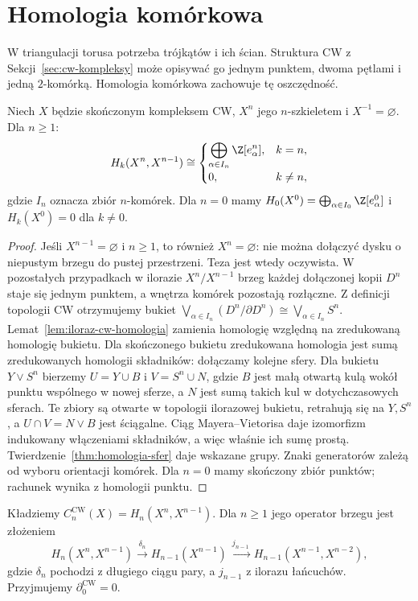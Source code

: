 \section{Homologia komórkowa}
\label{sec:homologia-komorkowa}

W triangulacji torusa potrzeba
trójkątów i ich ścian. Struktura
CW z Sekcji~\ref{sec:cw-kompleksy}
może opisywać go jednym punktem,
dwoma pętlami i jedną
$2$-komórką. Homologia komórkowa
zachowuje tę oszczędność.

\begin{twierdzenie}
\label{thm:warstwa-komorek}
Niech $X$ będzie skończonym
kompleksem CW, $X^n$ jego
$n$-szkieletem i $X^{-1}=\varnothing$.
Dla $n\geq1$:
\[
 H_k(X^n,X^{n-1})
 \cong
 \begin{cases}
 \displaystyle\bigoplus_{\alpha\in I_n}\Z[e_\alpha^n],
 &k=n,\\[3pt]0,&k\ne n,
 \end{cases}
\]
gdzie $I_n$ oznacza zbiór $n$-komórek.
Dla $n=0$ mamy
$H_0(X^0)=\bigoplus_{\alpha\in I_0}\Z[e_\alpha^0]$
i $H_k(X^0)=0$ dla $k\ne0$.
\end{twierdzenie}
\begin{proof}
Jeśli $X^{n-1}=\varnothing$ i $n\geq1$, to również $X^n=\varnothing$:
nie można dołączyć dysku o niepustym brzegu do pustej przestrzeni.
Teza jest wtedy oczywista. W pozostałych przypadkach
w ilorazie $X^n/X^{n-1}$
brzeg każdej dołączonej kopii
$D^n$ staje się jednym punktem,
a wnętrza komórek pozostają
rozłączne. Z definicji topologii
CW otrzymujemy bukiet
$\bigvee_{\alpha\in I_n}
(D^n/\partial D^n)\cong
\bigvee_{\alpha\in I_n}S^n$.
Lemat~\ref{lem:iloraz-cw-homologia}
zamienia homologię względną
na zredukowaną homologię bukietu.
Dla skończonego bukietu
zredukowana homologia jest sumą
zredukowanych homologii składników:
dołączamy kolejne sfery. Dla bukietu $Y\vee S^n$
bierzemy $U=Y\cup B$ i $V=S^n\cup N$, gdzie $B$ jest małą
otwartą kulą wokół punktu wspólnego w nowej sferze, a $N$
jest sumą takich kul w dotychczasowych sferach.
Te zbiory są otwarte w topologii ilorazowej bukietu,
retrahują się na $Y,S^n$, a $U\cap V=N\vee B$ jest ściągalne.
Ciąg Mayera--Vietorisa daje izomorfizm indukowany włączeniami
składników, a więc właśnie ich sumę prostą.
Twierdzenie~\ref{thm:homologia-sfer}
daje wskazane grupy.
Znaki generatorów zależą
od wyboru orientacji komórek.
Dla $n=0$ mamy skończony
zbiór punktów; rachunek wynika
z homologii punktu.
\end{proof}

\begin{definicja}
\label{def:kompleks-komorkowy}
Kładziemy
$C_n^{\mathrm{CW}}(X)=H_n(X^n,X^{n-1})$.
Dla $n\geq1$ jego operator brzegu
jest złożeniem
\begin{equation}\label{eq:cellular-boundary}
 H_n(X^n,X^{n-1})
 \xrightarrow{\ \delta_n\ }
 H_{n-1}(X^{n-1})
 \xrightarrow{\ j_{n-1}\ }
 H_{n-1}(X^{n-1},X^{n-2}),
\end{equation}
gdzie $\delta_n$ pochodzi z
długiego ciągu pary, a
$j_{n-1}$ z ilorazu łańcuchów.
Przyjmujemy $\partial_0^{\mathrm{CW}}=0$.
\end{definicja}


